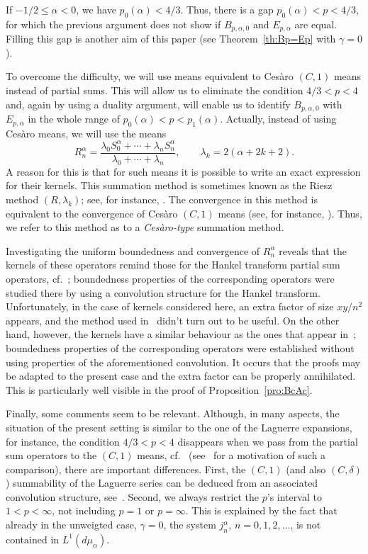 \documentclass[a4paper]{amsart}
\begin{document}
If $-1/2 \le \alpha < 0$, we have $ p_0(\alpha)<4/3$. Thus, there is a gap
$p_0(\alpha) < p < 4/3$, for which  the previous argument
does not show if $B_{p,\alpha,0}$ and $E_{p,\alpha}$ are equal.
Filling this gap is another  aim of this paper (see
Theorem~\ref{th:Bp=Ep} with $\gamma=0$).

To overcome the difficulty, we will use means equivalent to Ces\`aro
$(C,1)$ means instead of partial sums. This will allow us to
eliminate the condition $4/3 < p < 4$ and,
again by using a duality argument, will enable us to
identify $B_{p,\alpha,0}$ with $E_{p,\alpha}$ in the whole range of
$p_0(\alpha) < p < p_1(\alpha)$.
Actually, instead of using Ces\`aro means, we will use the means
\begin{equation}
\label{eq:Rna}
  R_n^\alpha =
  \frac{\lambda_0 S_0^\alpha + \cdots + \lambda_n S_n^\alpha}
    {\lambda_0 + \cdots + \lambda_n},
  \qquad \lambda_k = 2(\alpha+2k+2).
\end{equation}
A reason for this is that for such means it is possible to write an
exact expression for their kernels.
This summation method is sometimes known as the Riesz method
$(R,\lambda_k)$; see, for instance, \cite[\S\,59, p.~470]{Kno}.
The convergence in this method is equivalent
to the convergence of Ces\`aro $(C,1)$ means
(see, for instance, \cite[\S\,3.8, Th.~14]{Har}).
Thus, we refer to this method as to a \textit{Ces\`aro-type} summation method.

Investigating the uniform boundedness and convergence of
$R_n^\alpha$ reveals that the kernels of these operators remind
those for the Hankel transform
partial sum operators, cf.~\cite{CiV}; boundedness properties of the
corresponding operators were studied there by using a
convolution structure for the Hankel transform. Unfortunately, in
the case of kernels considered here, an extra factor of size
$xy/n^2$ appears, and the method used in~\cite{CiV} didn't turn out to be
useful. On the other hand, however, the kernels have a similar
behaviour as the ones that appear in~\cite{CiStV}; boundedness
properties of the corresponding operators were established without
using properties of the aforementioned convolution. It occurs that
the proofs may be adapted to the present case and the extra factor
can be properly annihilated. This is particularly well visible in the proof
of Proposition~\ref{pro:BcAc}.

Finally, some comments seem to be relevant.
Although, in many aspects, the situation of the present setting is
similar to the one of the Laguerre expansions, for instance, the
condition $4/3<p<4$ disappears when we pass from the partial sum
operators to the $(C,1)$ means, cf.~\cite{Po} (see~\cite{St03} for a
motivation of such a comparison), there are important differences. First,
the $(C,1)$ (and also $(C,\delta)$) summability of the Laguerre series
can be deduced from an associated convolution structure,
see~\cite{St91}. Second, we always restrict the $p$'s interval to
$1<p<\infty$, not including $p=1$ or $p=\infty$. This is explained by the fact that
already in the unweigted case, $\gamma=0$, the system $j_n^\alpha$, $n=0,1,2,\dots$,
is not contained in $L^1(d\mu_\alpha)$.
\end{document}
